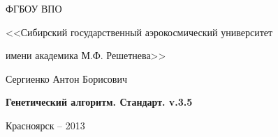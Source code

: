 \thispagestyle{empty}

\begin{center}
ФГБОУ ВПО \par
<<Сибирский государственный аэрокосмический университет \par имени академика М.Ф. Решетнева>>\par 
\par
\end{center}

\vspace{20mm}

\vspace{30mm}
\begin{center}
{\large Сергиенко Антон Борисович}
\end{center}

\vspace{5mm}
\begin{center}
{\bf \large Генетический алгоритм. Стандарт. v.3.5
\par}

\vspace{10mm}

\vspace{10mm}

\end{center}

\vspace{80mm}

\vspace{20mm}
\begin{center}
{Красноярск -- 2013}
\end{center}

\newpage